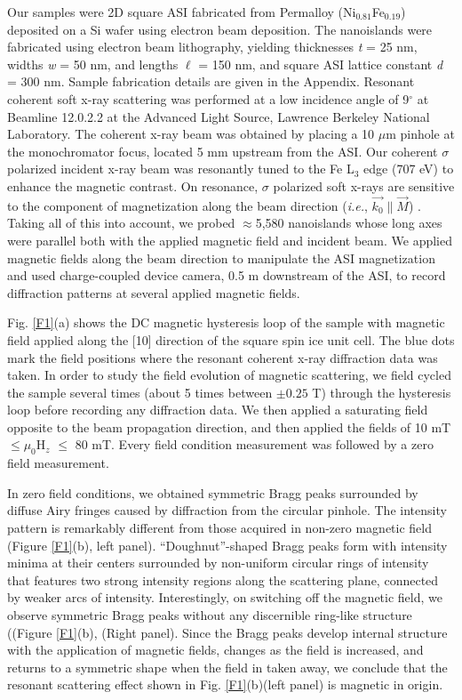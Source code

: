 \documentclass[aps, prb, reprint, showpacs, superscriptaddress]{revtex4-1}
\begin{document}
Our samples were 2D square ASI fabricated from Permalloy (Ni$_{0.81} $Fe$_{0.19}$) deposited on a Si wafer using electron beam deposition.   
The nanoislands were fabricated using electron beam lithography, yielding thicknesses \emph{t} = 25 nm, widths \emph{w} = 50 nm, and lengths \emph{$\ell$} = 150 nm, and square ASI lattice constant \emph{d} = 300 nm.
Sample fabrication details are given in the Appendix.
Resonant coherent soft x-ray scattering was performed at a low incidence angle of 9$^{\circ}$ at Beamline 12.0.2.2 at the Advanced Light Source, Lawrence Berkeley National Laboratory. 
The coherent x-ray beam was obtained by placing a 10 $\mu$m pinhole at the monochromator focus, located 5 mm upstream from the ASI.
Our coherent $\sigma$ polarized incident x-ray beam was resonantly tuned to the Fe  L$_3$ edge (707 eV) to enhance the magnetic contrast. 
On resonance, $\sigma$ polarized soft x-rays are sensitive to the component of magnetization along the beam direction (\textit{i.e.}, $\vec{k_0}$$\parallel$$\vec{M}$) \cite{Kortright}. 
Taking all of this into account, we probed $\approx$5,580 nanoislands whose long axes were parallel both with the applied magnetic field and incident beam.
We applied magnetic fields along the beam direction to manipulate the ASI magnetization and used charge-coupled device camera, 0.5 m downstream of the ASI, to record diffraction patterns at several applied magnetic fields. 

Fig. \ref{F1}(a) shows the DC magnetic hysteresis loop of the sample with magnetic field applied along the [10] direction of the square spin ice unit cell. 
The blue dots mark the field positions where the resonant coherent x-ray diffraction data was taken.
In order to study the field evolution of magnetic scattering, we field cycled the sample several times (about 5 times between $\pm {0.25}$ T) through the hysteresis loop before recording any diffraction data.
We then applied a saturating field opposite to the beam propagation direction, and then applied the fields of 10 mT $ \leq \mu_0$H$_z$ $\leq$ 80 mT.
Every field condition measurement was followed by a zero field measurement. 

In zero field conditions, we obtained symmetric Bragg peaks surrounded by diffuse Airy fringes caused by diffraction from the circular pinhole.
The intensity pattern is remarkably different from those acquired in non-zero magnetic field (Figure \ref{F1}(b), left panel). 
``Doughnut''-shaped Bragg peaks form with intensity minima at their centers surrounded by non-uniform circular rings of intensity that features two strong intensity regions along the scattering plane, connected by weaker arcs of intensity.
Interestingly, on switching off the magnetic field, we observe symmetric Bragg peaks without any discernible ring-like structure ((Figure \ref{F1}(b), (Right panel). 
Since the Bragg peaks develop internal structure with the application of magnetic fields, changes as the field is increased, and returns to a symmetric shape when the field in taken away, we conclude that the resonant scattering effect shown in Fig. \ref{F1}(b)(left panel) is magnetic in origin. 
\end{document}
